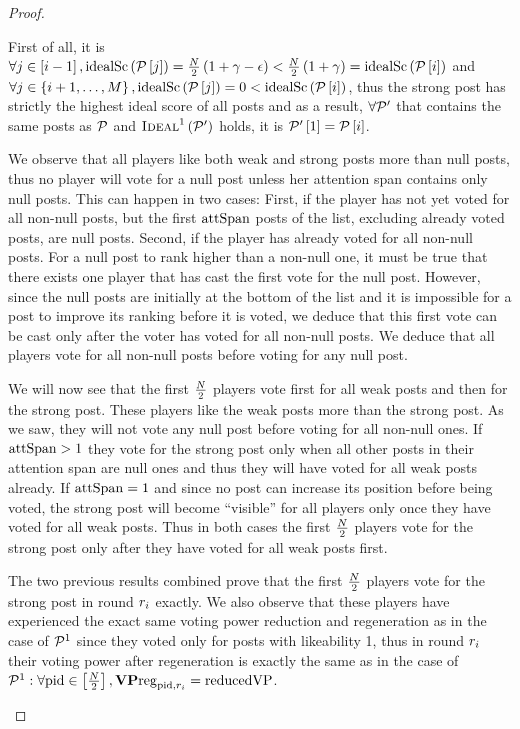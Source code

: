 \begin{proof}
\begin{itemize}
    First of all, it is $\forall j \in \left[i - 1\right],
    \mathrm{idealSc}\left(\mathcal{P}\left[j\right]\right) = \frac{N}{2}\left(1 + \gamma -
    \epsilon\right) < \frac{N}{2}\left(1 + \gamma\right) =
    \mathrm{idealSc}\left(\mathcal{P}\left[i\right]\right)$ and $\forall j \in \left\{i + 1, \dots,
    M\right\}, \mathrm{idealSc}\left(\mathcal{P}\left[j\right]\right) = 0 <
    \mathrm{idealSc}\left(\mathcal{P}\left[i\right]\right)$, thus the strong post has strictly the
    highest ideal score of all posts and as a result, $\forall \mathcal{P}'$ that
    contains the same posts as $\mathcal{P}$ and
    $\textsc{Ideal}^1\left(\mathcal{P}'\right)$ holds, it is
    $\mathcal{P}'\left[1\right] = \mathcal{P}\left[i\right]$.

    We observe that all players like both weak and strong posts more than null
    posts, thus no player will vote for a null post unless her attention span
    contains only null posts. This can happen in two cases: First, if the player
    has not yet voted for all non-null posts, but the first $\mathrm{attSpan}$ posts of
    the list, excluding already voted posts, are null posts. Second, if the
    player has already voted for all non-null posts. For a null post to rank
    higher than a non-null one, it must be true that there exists one player
    that has cast the first vote for the null post. However, since the null
    posts are initially at the bottom of the list and it is impossible for a
    post to improve its ranking before it is voted, we deduce that this first
    vote can be cast only after the voter has voted for all non-null posts. We
    deduce that all players vote for all non-null posts before voting for any
    null post.

    We will now see that the first $\frac{N}{2}$ players vote first for
    all weak posts and then for the strong post. These players like the weak
    posts more than the strong post. As we saw, they will not vote any null
    post before voting for all non-null ones. If $\mathrm{attSpan} > 1$ they vote for
    the strong post only when all other posts in their attention span are null
    ones and thus they will have voted for all weak posts already. If $\mathrm{attSpan}
    = 1$ and since no post can increase its position before being voted, the
    strong post will become ``visible'' for all players only once they have
    voted for all weak posts. Thus in both cases the first
    $\frac{N}{2}$ players vote for the strong post only after they have
    voted for all weak posts first.

    The two previous results combined prove that the first
    $\frac{N}{2}$ players vote for the strong post in round $r_i$
    exactly. We also observe that these players have experienced the exact same
    voting power reduction and regeneration as in the case of $\mathcal{P}^1$
    since they voted only for posts with likeability 1, thus in round $r_i$
    their voting power after regeneration is exactly the same as in the case of
    $\mathcal{P}^1: \forall \mathrm{pid} \in
    \left[\frac{N}{2}\right], \mathrm{\textbf{VP}reg}_{\mathrm{pid}, r_i} =
    \mathrm{reducedVP}$.


\end{itemize}
\end{proof}
